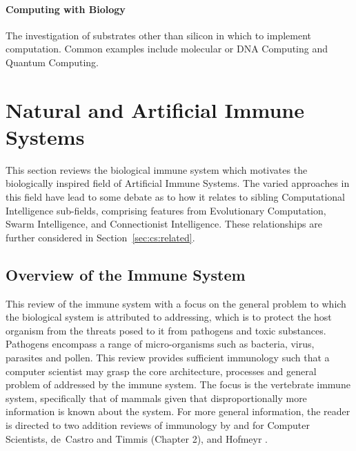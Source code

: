 \paragraph{Computing with Biology} The investigation of substrates other than silicon in which to implement computation. Common examples include molecular or DNA Computing and Quantum Computing.

%
%
\section{Natural and Artificial Immune Systems}
\label{sec:background:isandais}
This section reviews the biological immune system which motivates the biologically inspired field of Artificial Immune Systems. The varied approaches in this field have lead to some debate as to how it relates to sibling Computational Intelligence sub-fields, comprising features from Evolutionary Computation, Swarm Intelligence, and Connectionist Intelligence. These relationships are further considered in Section~\ref{sec:cs:related}.

%
%
\subsection{Overview of the Immune System}
\label{sec:immunology}
This review of the immune system with a focus on the general problem to which the biological system is attributed to addressing, which is to protect the host organism from the threats posed to it from pathogens and toxic substances. Pathogens encompass a range of micro-organisms such as bacteria, virus, parasites and pollen. This review provides sufficient immunology such that a computer scientist may grasp the core architecture, processes and general problem of addressed by the immune system. The focus is the vertebrate immune system, specifically that of mammals given that disproportionally more information is known about the system. For more general information, the reader is directed to two addition reviews of immunology by and for Computer Scientists, de~Castro and Timmis \cite{Castro2002b} (Chapter 2), and Hofmeyr \cite{Hofmeyr2001}.

